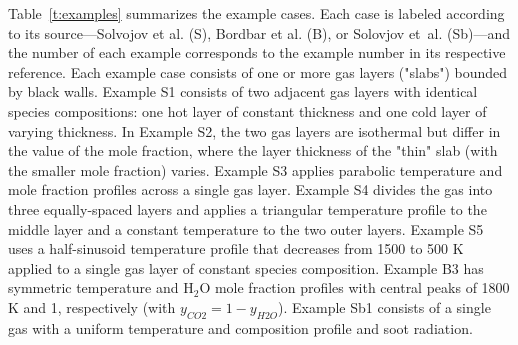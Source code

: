 \documentclass[preprint,12pt]{elsarticle}
\newcounter{bla}
\begin{document}
Table~\ref{t:examples} summarizes the example cases. Each case is labeled according to its source---Solvojov et al. \cite{Solovjov_2017} (S), Bordbar et al. \cite{Bordbar_2020} (B), or Solovjov et~al. \cite{Solovjov_2001} (Sb)---and the number of each example corresponds to the example number in its respective reference. Each example case consists of one or more gas layers ("slabs") bounded by black walls. 
Example S1 consists of two adjacent gas layers with identical species compositions: one hot layer of constant thickness and one cold layer of varying thickness. 
In Example S2, the two gas layers are isothermal but differ in the value of the  mole fraction, where the layer thickness of the "thin" slab (with the smaller  mole fraction) varies.
Example S3 applies parabolic temperature and  mole fraction profiles across a single gas layer. 
Example S4 divides the gas into three equally-spaced layers and applies a triangular temperature profile to the middle layer and a constant temperature to the two outer layers.
Example S5 uses a half-sinusoid temperature profile that decreases from 1500 to 500 K applied to a single gas layer of constant species composition.
Example B3 has symmetric temperature and H$_2$O mole fraction profiles with central peaks of 1800 K and 1, respectively (with $y_{CO2}=1-y_{H2O}$). 
Example Sb1 consists of a single gas with a uniform temperature and composition profile and soot radiation. 
%
\end{document}
